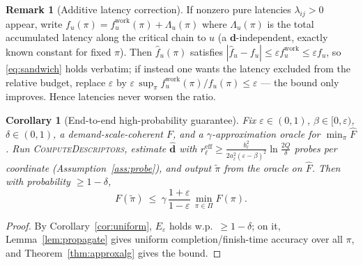 \documentclass{amsart}
\newtheorem{corollary}{Corollary}
\theoremstyle{definition}
\newtheorem{remark}{Remark}
\begin{document}
\begin{remark}[Additive latency correction]\label{rem:latency}
If nonzero pure latencies $\lambda_{ij}>0$ appear, write
$f_u(\pi)=f_u^{\mathrm{work}}(\pi)+\Lambda_u(\pi)$ where $\Lambda_u(\pi)$ is the
total accumulated latency along the critical chain to $u$ (a
$\mathbf d$-independent, exactly known constant for fixed $\pi$). Then
$\widehat f_u(\pi)$ satisfies $|\widehat f_u-f_u|\le\varepsilon f_u^{\mathrm{work}}
\le\varepsilon f_u$, so \eqref{eq:sandwich} holds verbatim; if instead one wants
the latency excluded from the relative budget, replace $\varepsilon$ by
$\varepsilon\,\sup_\pi f_u^{\mathrm{work}}(\pi)/f_u(\pi)\le\varepsilon$ — the
bound only improves. Hence latencies never worsen the ratio.
\end{remark}

\begin{corollary}[End-to-end high-probability guarantee]\label{cor:e2e}
Fix $\varepsilon\in(0,1)$, $\beta\in[0,\varepsilon)$, $\delta\in(0,1)$, a
demand-scale-coherent $F$, and a $\gamma$-approximation oracle for
$\min_\pi\widehat F$. Run \textsc{ComputeDescriptors}, estimate
$\widehat{\mathbf d}$ with
$r_\ell^{\mathrm{eff}}\ge\frac{b_\ell^2}{2a_\ell^2(\varepsilon-\beta)^2}\ln\frac{2Q}{\delta}$
probes per coordinate (Assumption~\ref{ass:probe}), and output
$\tilde\pi$ from the oracle on $\widehat F$. Then with probability $\ge1-\delta$,
\[
F(\tilde\pi)\ \le\ \gamma\,\frac{1+\varepsilon}{1-\varepsilon}\,\min_{\pi\in\Pi}F(\pi).
\]
\end{corollary}

\begin{proof}
By Corollary~\ref{cor:uniform}, $E_\varepsilon$ holds w.p.\ $\ge1-\delta$; on it,
Lemma~\ref{lem:propagate} gives uniform completion/finish-time accuracy over all
$\pi$, and Theorem~\ref{thm:approxalg} gives the bound.
\end{proof}
\end{document}
